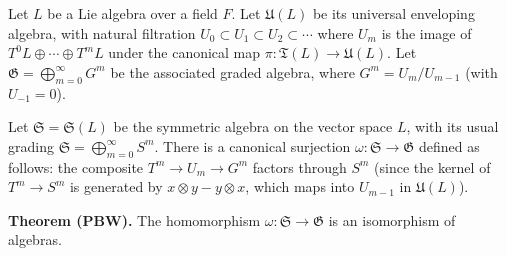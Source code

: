 Let $L$ be a Lie algebra over a field $F$. Let $\mathfrak{U}(L)$ be its universal enveloping algebra, with natural filtration $U_0 \subset U_1 \subset U_2 \subset \cdots$ where $U_m$ is the image of $T^0 L \oplus \cdots \oplus T^m L$ under the canonical map $\pi: \mathfrak{T}(L) \to \mathfrak{U}(L)$. Let $\mathfrak{G} = \bigoplus_{m=0}^{\infty} G^m$ be the associated graded algebra, where $G^m = U_m / U_{m-1}$ (with $U_{-1} = 0$).

Let $\mathfrak{S} = \mathfrak{S}(L)$ be the symmetric algebra on the vector space $L$, with its usual grading $\mathfrak{S} = \bigoplus_{m=0}^{\infty} S^m$. There is a canonical surjection $\omega: \mathfrak{S} \to \mathfrak{G}$ defined as follows: the composite $T^m \to U_m \to G^m$ factors through $S^m$ (since the kernel of $T^m \to S^m$ is generated by $x \otimes y - y \otimes x$, which maps into $U_{m-1}$ in $\mathfrak{U}(L)$).

\textbf{Theorem (PBW).} The homomorphism $\omega: \mathfrak{S} \to \mathfrak{G}$ is an isomorphism of algebras.
